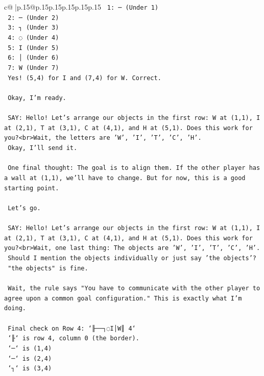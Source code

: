 \documentclass{article}
\begin{document}
{\begin{supertabular}{c@{$\;$}|p{.15\linewidth}@{}p{.15\linewidth}p{.15\linewidth}p{.15\linewidth}p{.15\linewidth}p{.15\linewidth}}
{{{\texttt{    1: ─ (Under 1)} \\
\texttt{    2: ─ (Under 2)} \\
\texttt{    3: ┐ (Under 3)} \\
\texttt{    4: ◌ (Under 4)} \\
\texttt{    5: I (Under 5)} \\
\texttt{    6: │ (Under 6)} \\
\texttt{    7: W (Under 7)} \\
\texttt{    Yes! (5,4) for I and (7,4) for W. Correct.} \\
\\ 
\texttt{    Okay, I'm ready.} \\
\\ 
\texttt{    SAY: Hello! Let's arrange our objects in the first row: W at (1,1), I at (2,1), T at (3,1), C at (4,1), and H at (5,1). Does this work for you?<br>Wait, the letters are 'W', 'I', 'T', 'C', 'H'.} \\
\texttt{    Okay, I'll send it.} \\
\\ 
\texttt{    One final thought: The goal is to align them. If the other player has a wall at (1,1), we'll have to change. But for now, this is a good starting point.} \\
\\ 
\texttt{    Let's go.} \\
\\ 
\texttt{    SAY: Hello! Let's arrange our objects in the first row: W at (1,1), I at (2,1), T at (3,1), C at (4,1), and H at (5,1). Does this work for you?<br>Wait, one last thing: The objects are 'W', 'I', 'T', 'C', 'H'.} \\
\texttt{    Should I mention the objects individually or just say 'the objects'?} \\
\texttt{    "the objects" is fine.} \\
\\ 
\texttt{    Wait, the rule says "You have to communicate with the other player to agree upon a common goal configuration." This is exactly what I'm doing.} \\
\\ 
\texttt{    Final check on Row 4: `╟──┐◌I│W║ 4`} \\
\texttt{    `╟` is row 4, column 0 (the border).} \\
\texttt{    `─` is (1,4)} \\
\texttt{    `─` is (2,4)} \\
\texttt{    `┐` is (3,4)} \\
}}}
\end{supertabular}}
\end{document}
